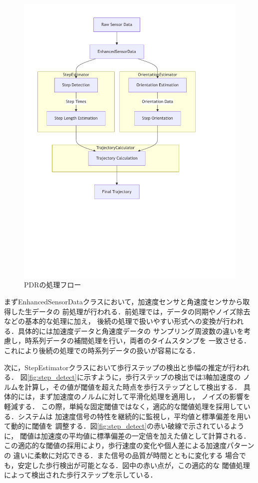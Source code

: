 \begin{figure}[H]
    \centering
    \includegraphics[width=\linewidth]{../image/pdr-flow-diagram.pdf}
    \caption{PDRの処理フロー}
    \label{fig:pdr-flow}
\end{figure}

まずEnhancedSensorDataクラスにおいて，加速度センサと角速度センサから取得した生データの
前処理が行われる．前処理では，データの同期やノイズ除去などの基本的な処理に加え，
後続の処理で扱いやすい形式への変換が行われる．具体的には加速度データと角速度データの
サンプリング周波数の違いを考慮し，時系列データの補間処理を行い，両者のタイムスタンプを
一致させる．これにより後続の処理での時系列データの扱いが容易になる．


次に，StepEstimatorクラスにおいて歩行ステップの検出と歩幅の推定が行われる．
図\ref{fig:step_detect}に示すように，歩行ステップの検出では3軸加速度の
ノルムを計算し，その値が閾値を超えた時点を歩行ステップとして検出する．
具体的には，まず加速度のノルムに対して平滑化処理を適用し，
ノイズの影響を軽減する．
この際，単純な固定閾値ではなく，適応的な閾値処理を採用している．システムは
加速度信号の特性を継続的に監視し，平均値と標準偏差を用いて動的に閾値を
調整する．図\ref{fig:step_detect}の赤い破線で示されているように，
閾値は加速度の平均値に標準偏差の一定倍を加えた値として計算される．
この適応的な閾値の採用により，歩行速度の変化や個人差による加速度パターンの
違いに柔軟に対応できる．また信号の品質が時間とともに変化する
場合でも，安定した歩行検出が可能となる．図中の赤い点が，この適応的な
閾値処理によって検出された歩行ステップを示している．

